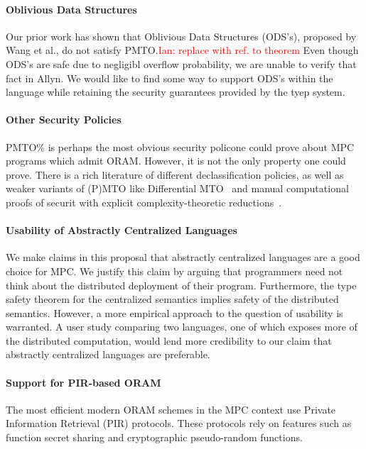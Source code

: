 \documentclass{report}
\newcommand{\lang}{Allyn\xspace}
\newcommand{\ins}[1]{\textcolor{red}{Ian: #1}}
\begin{document}
\paragraph{Oblivious Data Structures}
Our prior work has shown that Oblivious Data Structures (ODS's), proposed by Wang et al., do not satisfy PMTO.\ins{replace with ref. to theorem} Even though ODS's are safe due to negligibl overflow probability, we are unable to verify that fact in \lang. We would like to find some
way to support ODS's within the language while retaining the security guarantees provided by the tyep system.

\paragraph{Other Security Policies}
PMTO\% is perhaps the most obvious security policone could prove about MPC programs which admit ORAM. However, it is not the only property
one could prove. There is a rich literature of different declassification policies, as well as weaker variants of (P)MTO like Differential
MTO~\cite{} and manual computational proofs of securit with explicit complexity-theoretic reductions~\cite{easycrypt}.

\paragraph{Usability of Abstractly Centralized Languages}
We make claims in this proposal that abstractly centralized languages are a good choice for MPC. We justify this claim by arguing that
programmers need not think about the distributed deployment of their program. Furthermore, the type safety theorem for the centralized
semantics implies safety of the distributed semantics. However, a more empirical approach to the question of usability is warranted.
A user study comparing two languages, one of which exposes more of the distributed computation, would lend more credibility to our claim
that abstractly centralized languages are preferable.

\paragraph{Support for PIR-based ORAM}
The most efficient modern ORAM schemes in the MPC context use Private Information Retrieval (PIR) protocols. These protocols rely on
features such as function secret sharing and cryptographic pseudo-random functions.

\appendix
\end{document}
